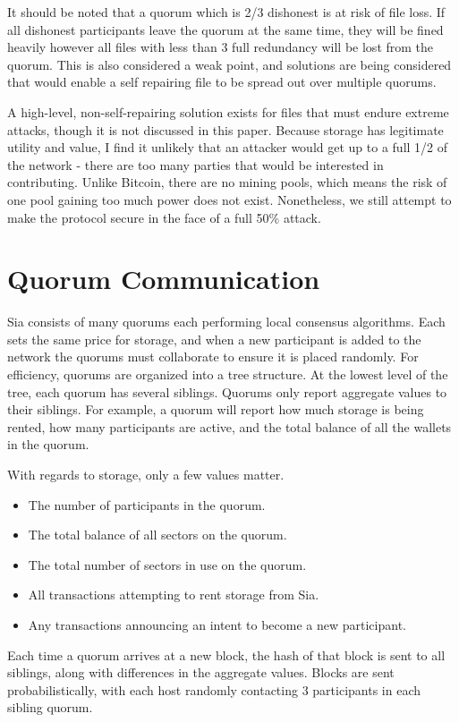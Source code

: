 \documentclass[twocolumn]{article}
\begin{document}
It should be noted that a quorum which is 2/3 dishonest is at risk of file loss.
If all dishonest participants leave the quorum at the same time, they will be fined heavily however all files with less than 3 full redundancy will be lost from the quorum.
This is also considered a weak point, and solutions are being considered that would enable a self repairing file to be spread out over multiple quorums.

A high-level, non-self-repairing solution exists for files that must endure extreme attacks, though it is not discussed in this paper.
Because storage has legitimate utility and value, I find it unlikely that an attacker would get up to a full 1/2 of the network - there are too many parties that would be interested in contributing.
Unlike Bitcoin, there are no mining pools, which means the risk of one pool gaining too much power does not exist.
Nonetheless, we still attempt to make the protocol secure in the face of a full 50\% attack.

\section{Quorum Communication}
Sia consists of many quorums each performing local consensus algorithms.
Each sets the same price for storage, and when a new participant is added to the network the quorums must collaborate to ensure it is placed randomly.
For efficiency, quorums are organized into a tree structure.
At the lowest level of the tree, each quorum has several siblings.
Quorums only report aggregate values to their siblings.
For example, a quorum will report how much storage is being rented, how many participants are active, and the total balance of all the wallets in the quorum.

With regards to storage, only a few values matter.
\begin{itemize}
	\item The number of participants in the quorum.
	\item The total balance of all sectors on the quorum.
	\item The total number of sectors in use on the quorum.
	\item All transactions attempting to rent storage from Sia.
	\item Any transactions announcing an intent to become a new participant.
\end{itemize}

Each time a quorum arrives at a new block, the hash of that block is sent to all siblings, along with differences in the aggregate values.
Blocks are sent probabilistically, with each host randomly contacting 3 participants in each sibling quorum.
\end{document}
